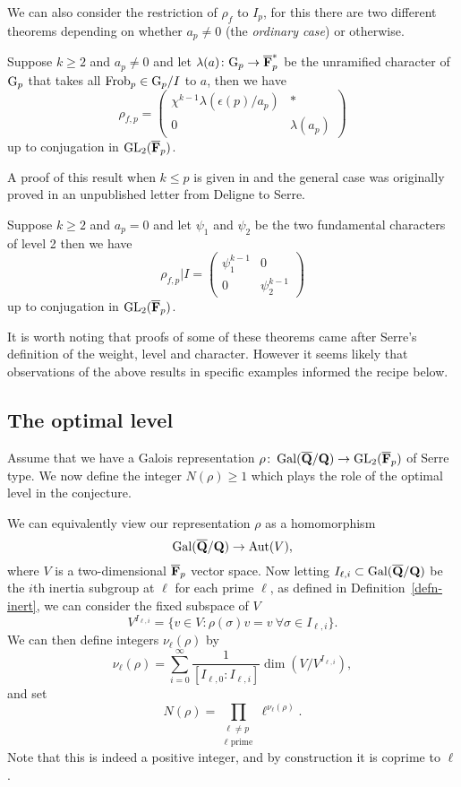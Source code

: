 \documentclass[a4paper,12pt]{article}
\begin{document}
We can also consider the restriction of $\rho_f$ to $I_p$, for this there are two different theorems depending on whether $a_p \ne 0$ (the \emph{ordinary case}) or otherwise.

\begin{thm}[Deligne]
Suppose $k\ge 2$ and $a_p \ne 0$ and let $\lambda(a)\colon \mathrm{G}_p \to \overline{\mathbf{F}}_p^*$ be the unramified character of $\mathrm{G}_p$ that takes all $\operatorname{Frob}_p \in \mathrm{G}_p /I$ to $a$, then we have
\[
\rho_{f,p} = \begin{pmatrix} \chi^{k-1}\lambda(\epsilon(p)/a_p) & * \\ 0 & \lambda(a_p)\end{pmatrix}
\]
up to conjugation in $\operatorname{GL}_2(\overline{\mathbf{F}}_p)$.
\end{thm}

A proof of this result when $k \le p$ is given in \cite{Gross} and the general case was originally proved in an unpublished letter from Deligne to Serre.

\begin{thm}[Fontaine]
Suppose $k\ge 2$ and $a_p = 0$ and let $\psi_1$ and $\psi_2$ be the two fundamental characters of level 2 then we have
\[
\rho_{f,p}|I = \begin{pmatrix} \psi_1^{k-1} & 0 \\ 0 & \psi_2^{k-1}\end{pmatrix}
\]
up to conjugation in $\operatorname{GL}_2(\overline{\mathbf{F}}_p)$.
\end{thm}

It is worth noting that proofs of some of these theorems came after Serre's definition of the weight, level and character.
However it seems likely that observations of the above results in specific examples informed the recipe below.

\subsection{The optimal level}
Assume that we have a Galois representation $\rho\colon \operatorname{Gal}(\overline{\mathbf{Q}}/\mathbf{Q}) \to \operatorname{GL}_2(\overline{\mathbf{F}}_p)$ of Serre type.
We now define the integer $N(\rho) \ge 1$ which plays the role of the optimal level in the conjecture.

We can equivalently view our representation $\rho$ as a homomorphism
\[
\operatorname{Gal}(\overline{\mathbf{Q}}/\mathbf{Q}) \to \operatorname{Aut}(V),
\]
where $V$ is a two-dimensional $\overline{\mathbf{F}}_p$ vector space.
Now letting $I_{\ell,i}\subset \operatorname{Gal}(\overline{\mathbf{Q}}/\mathbf{Q})$ be the $i$th inertia subgroup at $\ell$ for each prime $\ell$, as defined in Definition~\ref{defn-inert}, we can consider the fixed subspace of $V$
\[
V^{I_{\ell,i}} = \{v\in V : \rho(\sigma) v = v\ \forall \sigma \in I_{\ell,i}\}.
\]
We can then define integers $\nu_\ell(\rho)$ by
\[
\nu_\ell(\rho) = \sum_{i = 0}^{\infty} \frac{1}{[I_{\ell,0} : I_{\ell,i}]} \dim\left(V/V^{I_{\ell,i}}\right),
\]
and set
\[
N(\rho) = \prod_{\substack{\ell \ne p\\ \ell\text{ prime}}} \ell^{\nu_\ell(\rho)}.
\]
Note that this is indeed a positive integer, and by construction it is coprime to $\ell$.
\end{document}
